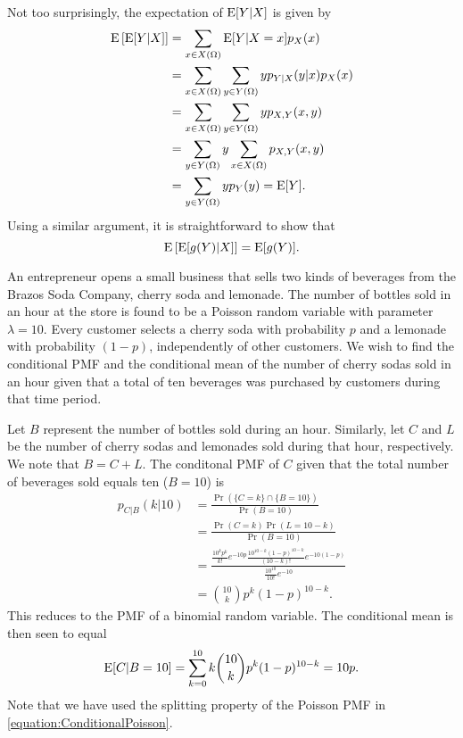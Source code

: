 Not too surprisingly, the expectation of $\mathrm{E} [Y | X]$ is given by
\begin{equation*}
\begin{split}
\mathrm{E} \left[ \mathrm{E} [Y | X] \right]
&= \sum_{x \in X(\Omega)} \mathrm{E} [Y | X = x] p_X (x) \\
&= \sum_{x \in X(\Omega)} \sum_{y \in Y(\Omega)} y p_{Y|X} (y|x) p_X (x) \\
&= \sum_{x \in X(\Omega)} \sum_{y \in Y(\Omega)} y p_{X,Y} (x, y) \\
&= \sum_{y \in Y(\Omega)} y \sum_{x \in X(\Omega)} p_{X,Y} (x, y) \\
&= \sum_{y \in Y(\Omega)} y p_{Y} (y)
= \mathrm{E} [Y] .
\end{split}
\end{equation*}
Using a similar argument, it is straightforward to show that
\begin{equation*}
\mathrm{E} \left[ \mathrm{E} [g (Y) | X] \right] = \mathrm{E} [g(Y)] .
\end{equation*}

\begin{example}
An entrepreneur opens a small business that sells two kinds of beverages from the Brazos Soda Company, cherry soda and lemonade.
The number of bottles sold in an hour at the store is found to be a Poisson random variable with parameter $\lambda = 10$.
Every customer selects a cherry soda with probability $p$ and a lemonade with probability $(1 - p)$, independently of other customers.
We wish to find the conditional PMF and the conditional mean of the number of cherry sodas sold in an hour given that a total of ten beverages was purchased by customers during that time period.

Let $B$ represent the number of bottles sold during an hour.
Similarly, let $C$ and $L$ be the number of cherry sodas and lemonades sold during that hour, respectively.
We note that $B = C + L$.
The conditonal PMF of $C$ given that the total number of beverages sold equals ten ($B = 10$) is
\begin{equation} \label{equation:ConditionalPoisson}
\begin{split}
p_{C|B} (k | 10)
&= \frac{ \Pr \left( \{ C = k \} \cap \{ B = 10 \} \right) }
{ \Pr (B = 10) } \\
&= \frac{ \Pr ( C = k ) \Pr ( L = 10-k ) }{ \Pr (B = 10) } \\
&= \frac{ \frac{ 10^k p^k }{ k!} e^{-10p}
\frac{10^{10-k} (1-p)^{10-k}}{(10-k)!} e^{-10(1-p)} }
{ \frac{ 10^{10} }{ 10!} e^{-10} } \\
&= \binom{10}{k} p^k (1-p)^{10-k} .
\end{split}
\end{equation}
This reduces to the PMF of a binomial random variable.
The conditional mean is then seen to equal
\begin{equation*}
\mathrm{E} [ C | B=10] = \sum_{k=0}^{10}
k \binom{10}{k} p^k (1-p)^{10-k} = 10 p .
\end{equation*}
Note that we have used the splitting property of the Poisson PMF in \eqref{equation:ConditionalPoisson}.
\end{example}

